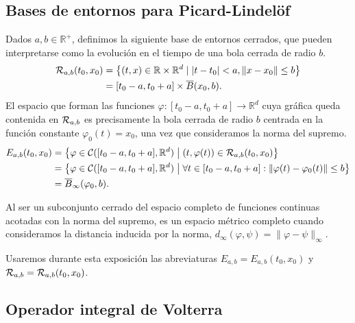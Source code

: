 \documentclass[11pt]{article}
\theoremstyle{plain}
\theoremstyle{definition}
\theoremstyle{remark}
\begin{document}
\subsection{Bases de entornos para Picard-Lindelöf}\label{base-entornos}

Dados \(a,b\in \mathbb{R}^+\), definimos la siguiente base de entornos
cerrados, que pueden interpretarse como la evolución en el tiempo de una bola
cerrada de radio \(b\).
\begin{align*}
  {\cal R}_{a,b}(t_0,x_0)
  &=
    \left\{ (t,x) \in \mathbb{R}\times \mathbb{R}^d \mid |t - t_0| < a, \|x - x_0\| \leq b \right\}
  \\&=
    [t_0-a,t_0+a] \times \overline{B}(x_0,b).
\end{align*}
El espacio que forman las funciones \(\varphi \colon [t_0 - a, t_0 + a] \to \mathbb{R}^d\) cuya gráfica queda
contenida en \({\cal R}_{a,b}\) es precisamente la bola cerrada de radio \(b\) centrada
en la función constante \(\varphi_0(t) = x_0\), una vez que consideramos la norma
del supremo.
\begin{align*}
  E_{a,b}(t_0,x_0) &=
  \left\{ \varphi \in {\cal C}([t_0-a,t_0+a],\mathbb{R}^d) \;\middle|\; 
    (t,\varphi(t)) \in {\cal R}_{a,b}(t_0,x_0)  \right\}
  \\&= \left\{ \varphi \in {\cal C}([t_0-a,t_0+a],\mathbb{R}^d) \;\middle|\;
    \forall t \in [t_0-a,t_0+a]: \|\varphi(t) - \varphi_0(t)\| \leq b \right\}
  \\&= 
  \overline{B}_{\infty}(\varphi_0,b).
\end{align*}

Al ser un subconjunto cerrado del espacio completo de funciones continuas
acotadas con la norma del supremo, es un espacio métrico completo
cuando consideramos la distancia inducida por la norma, \(d_{\infty}(\varphi,\psi) = \|\varphi - \psi\|_{\infty}\).

Usaremos durante esta exposición las abreviaturas \(E_{a,b} = E_{a,b}(t_0,x_0)\)
y \({\cal R}_{a,b} = {\cal R}_{a,b}(t_0,x_0)\).


\subsection{Operador integral de Volterra}
\end{document}
